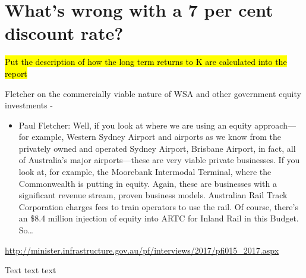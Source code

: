 \chapter{What's wrong with a 7 per cent discount rate?}\label{chap:what-is-wrong-with-seven-per-cent}


\hl{Put the description of how the long term returns to K are calculated into the report}

Fletcher on the commercially viable nature of WSA and other government equity investments - 
\begin{itemize}
    \item Paul Fletcher: Well, if you look at where we are using an equity approach—for example, Western Sydney Airport and airports as we know from the privately owned and operated Sydney Airport, Brisbane Airport, in fact, all of Australia's major airports—these are very viable private businesses. If you look at, for example, the Moorebank Intermodal Terminal, where the Commonwealth is putting in equity. Again, these are businesses with a significant revenue stream, proven business models. Australian Rail Track Corporation charges fees to train operators to use the rail. Of course, there's an \$8.4 million injection of equity into ARTC for Inland Rail in this Budget. So…
\end{itemize}
\url{http://minister.infrastructure.gov.au/pf/interviews/2017/pfi015_2017.aspx}


Text text text%
    \textcite{treasury2010link-between-fiscal-policy-and-interest-rates}
